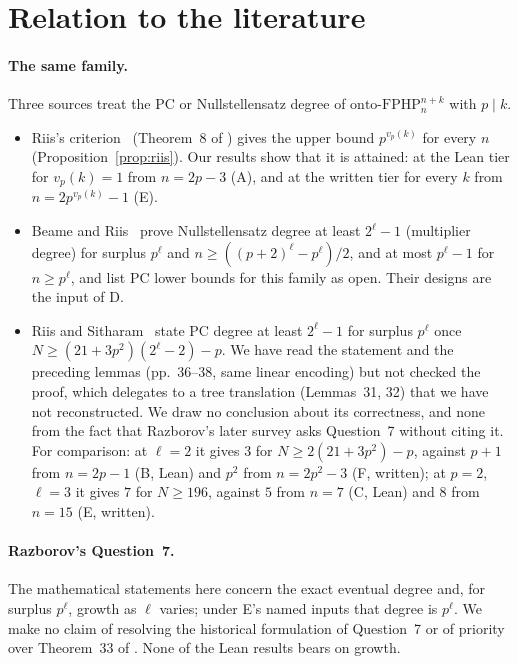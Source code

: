
\section{Relation to the literature}\label{sec:literature}

\paragraph{The same family.}  Three sources treat the PC or Nullstellensatz degree of
$\mathrm{onto\text{-}FPHP}^{n+k}_n$ with $p\mid k$.
\begin{itemize}
\item Riis's criterion~\cite{riis1993independence} (Theorem~8 of \cite{razborov2001php}) gives
  the upper bound $p^{v_p(k)}$ for every $n$ (Proposition~\ref{prop:riis}).  Our results show
  that it is attained: at the Lean tier for $v_p(k)=1$ from $n=2p-3$ (A), and at the written
  tier for every $k$ from $n=2p^{v_p(k)}-1$ (E).
\item Beame and Riis~\cite{beame1998counting} prove Nullstellensatz degree at least
  $2^\ell-1$ (multiplier degree) for surplus $p^\ell$ and $n\ge((p+2)^\ell-p^\ell)/2$, and at
  most $p^\ell-1$ for $n\ge p^\ell$, and list PC lower bounds for this family as open.  Their designs are the input of D.
\item Riis and Sitharam~\cite[Thm.~33]{riis1997nonconstant} state PC degree at least $2^\ell-1$
  for surplus $p^\ell$ once $N\ge(21+3p^2)(2^\ell-2)-p$.  We have read the statement and the
  preceding lemmas (pp.~36--38, same linear encoding) but not checked the proof, which
  delegates to a tree translation (Lemmas~31, 32) that we have not reconstructed.  We draw no
  conclusion about its correctness, and none from the fact that Razborov's later survey asks
  Question~7 without citing it.  For comparison: at $\ell=2$ it gives $3$ for
  $N\ge2(21+3p^2)-p$, against $p+1$ from $n=2p-1$ (B, Lean) and $p^2$ from $n=2p^2-3$ (F,
  written); at $p=2$, $\ell=3$ it gives $7$ for $N\ge196$, against $5$ from $n=7$ (C, Lean)
  and $8$ from $n=15$ (E, written).
\end{itemize}

\paragraph{Razborov's Question~7.}  The mathematical statements here concern the exact
eventual degree and, for surplus $p^\ell$, growth as $\ell$ varies; under E's named inputs
that degree is $p^\ell$.  We make no claim of resolving the historical formulation of
Question~7 or of priority over Theorem~33 of \cite{riis1997nonconstant}.  None of the Lean
results bears on growth.

